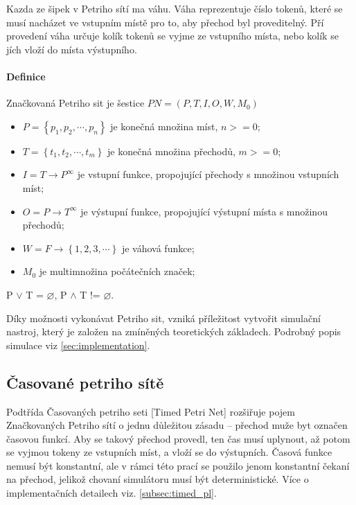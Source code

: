 Kazda ze šipek v Petriho sítí ma váhu. Váha reprezentuje číslo tokenů, které se musí nacházet ve vstupním místě pro to, aby přechod byl proveditelný. Pří provedení váha určuje kolík tokenů se vyjme ze vstupního místa, nebo kolík se jích vloží do místa výstupního.

\paragraph{Definice}

Značkovaná Petriho sit je šestice $PN = \left(P, T, I, O, W, M_0\right)$
\begin{itemize}
  \item $P = \left\{p_1, p_2, \cdots , p_n\right\}$ je konečná množina míst, $n >= 0$; \\
  \item $T = \left\{t_1, t_2, \cdots , t_m\right\}$ je konečná množina přechodů, $m >= 0$; \\
  \item $I = T \rightarrow P^\infty$ je vstupní funkce, propojující přechody s množinou vstupních míst; \\
  \item $O = P \rightarrow T^\infty$ je výstupní funkce, propojující výstupní místa s množinou přechodů; \\
  \item $W = F \rightarrow \left\{1, 2, 3, \cdots \right\}$ je váhová funkce; \\
  \item $M_0$ je multimnožina počátečních značek;
\end{itemize}
P $\vee$ T = $\varnothing$, P $\wedge$ T != $\varnothing$.

Díky možnosti vykonávat Petriho sit, vzniká příležitost vytvořit simulační nastroj, který je založen na zmíněných teoretických základech. Podrobný popis simulace viz \ref{sec:implementation}.

\subsection{Časované petriho sítě}
\label{subsec:timed-pn}

Podtřída Časovaných petriho seti [Timed Petri Net] rozšiřuje pojem Značkovaných Petriho sítí o jednu důležitou zásadu -- přechod muže byt označen časovou funkcí. Aby se takový přechod provedl, ten čas musí uplynout, až potom se vyjmou tokeny ze vstupních míst, a vloží se do výstupních. Časová funkce nemusí být konstantní, ale v rámci této prací se použilo jenom konstantní čekaní na přechod, jelikož chovaní simulátoru musí být deterministické. Více o implementačních detailech viz. \ref{subsec:timed_pl}.

